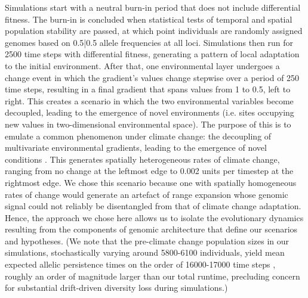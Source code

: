 \documentclass[9pt,twocolumn,twoside,lineno]{new_article}
\begin{document}
Simulations start with a neutral burn-in period that does not include differential fitness.
The burn-in is concluded when statistical tests
of temporal and spatial population stability are passed,
at which point individuals are randomly assigned genomes
based on 0.5|0.5 allele frequencies at all loci.
Simulations then run for 2500 time steps with differential fitness,
generating a pattern of local adaptation to the initial environment.
After that, one environmental layer undergoes a change 
event in which the gradient’s values change stepwise over a period of 250 time steps,
resulting in a final gradient that spans values from 1 to 0.5, left to right.
This creates a scenario in 
which the two environmental variables become decoupled, leading 
to the emergence of novel environments (i.e. sites occupying new values in 
two-dimensional environmental space).
The purpose of this is to emulate a common 
phenomenon under climate change: the decoupling of multivariate environmental gradients,
leading to the emergence of novel conditions
\cite{williams_novel_climates,williams_projected_novel_disappearing,fitzpatrick}.
This generates spatially heterogeneous rates of climate change, ranging from no change at the leftmost edge to 0.002 units per timestep at the rightmost edge.
We chose this scenario because one with spatially homogeneous rates of change would generate an artefact of range expansion
whose genomic signal could not reliably be disentangled from that of
climate change adaptation. Hence, the approach we chose here allows us
to isolate the evolutionary dynamics
resulting from the components of genomic architecture
that define our scenarios and hypotheses.
(We note that the pre-climate change population sizes in our simulations,
stochastically varying around 5800-6100 individuals,
yield mean expected allelic persistence times
on the order of 16000-17000 time steps \cite{wright,terasaki_hart},
roughly an order of magnitude larger than our total runtime,
precluding concern for substantial drift-driven diversity loss during simulations.)
\end{document}
